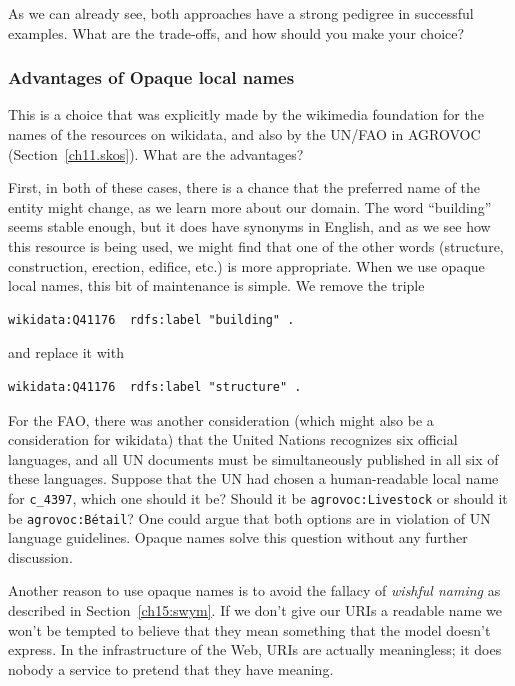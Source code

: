 As we can already see, both approaches have a strong pedigree in successful examples.  
What are the trade-offs, and how should you make your choice? 

\subsubsection{Advantages of Opaque local names}
This is a choice that was explicitly made by the wikimedia foundation for the names of the 
resources on wikidata, and also by the UN/FAO in AGROVOC (Section~\ref{ch11.skos}).  What
are the advantages? 

First, in both of these cases, there is a chance that the preferred name of the
entity might change, as we learn more about our domain.  The word ``building'' seems 
stable enough, but it does have synonyms in English, and as we see how this resource is
being used, we might find that one of the other words (structure, construction, 
erection, edifice, etc.) 
is more appropriate.  When we use opaque local names, this bit of maintenance is simple.  We remove the triple

\begin{lstlisting}
wikidata:Q41176  rdfs:label "building" .
\end{lstlisting}

and replace it with


\begin{lstlisting}
wikidata:Q41176  rdfs:label "structure" .
\end{lstlisting}

For the FAO, there was another consideration (which might also be a consideration 
for wikidata)
that the United Nations recognizes six official languages, and all 
UN documents must be simultaneously published in all six of these languages. 
Suppose that the UN had chosen a human-readable local name for \texttt{c\_4397}, which one
should it be?  Should it be \texttt{agrovoc:Livestock} or should it be 
\texttt{agrovoc:B\'etail}?  One could argue that both options are in violation of 
UN language guidelines.  Opaque names solve this question without any further 
discussion. 

Another reason to use opaque names is to avoid the fallacy of \emph{wishful naming} 
as described in Section~\ref{ch15:swym}.  If we don't give our URIs a readable name
we won't be tempted to believe that they mean something that the model doesn't 
express.  In the infrastructure of the Web, URIs are actually meaningless; it does
nobody a service to pretend that they have meaning. 

